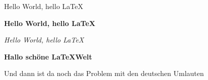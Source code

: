 \documentclass[12pt, a4paper]{article}
\begin{document}


Hello World, hello \LaTeX

\textbf{Hello World, hello \LaTeX}

\textit{Hello World, hello \LaTeX}

\textbf{Hallo schöne \LaTeX Welt}

Und dann ist da noch das Problem mit den deutschen Umlauten
\end{document}
